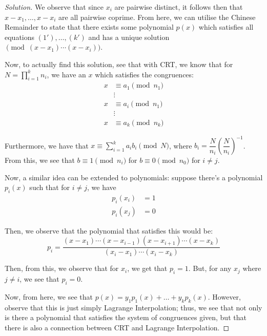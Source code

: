 \documentclass{article}
\newenvironment{solution}{\begin{proof}[Solution]}{\end{proof}}
\let\oldprod\prod
\renewcommand{\prod}[2]{\oldprod\limits_{#1}^{#2}}
\let\oldsum\sum
\renewcommand{\sum}[2]{\oldsum\limits_{#1}^{#2}}
\begin{document}
\begin{solution}
	We observe that since $x_{i}$ are pairwise distinct, it follows then that $x-x_{1}, \ldots, x-x_{i}$ are all pairwise coprime. From here, we can utilise the Chinese Remainder to state that there exists some polynomial $p(x)$ which satisfies all equations $(1'), \ldots, (k')$ and has a unique solution $\pmod{(x-x_{1}) \cdots (x-x_{i})}$.
	
	Now, to actually find this solution, see that with CRT, we know that for $N = \prod{i=1}{k} n_{i}$, we have an $x$ which satisfies the congruences:
	\begin{align*}
		x &\equiv a_{1} \pmod{n_{1}} \\
		&\vdots \\
		x &\equiv a_{i} \pmod{n_{1}} \\
		&\vdots \\
		x &\equiv a_{k} \pmod{n_{k}}
	\end{align*}

	Furthermore, we have that $x \equiv \sum{i=1}{k} a_{i}b_{i} \pmod{N}$, where $b_{i} = \dfrac{N}{n_{i}}\left( \dfrac{N}{n_{i}} \right)^{-1}$. From this, we see that $b \equiv 1 \pmod{n_{i}}$ for $b \equiv 0 \pmod{n_{0}}$ for $i \not= j$.
	
	Now, a similar idea can be extended to polynomials: suppose there's a polynomial $p_{i}(x)$ such that for $i \not= j$, we have
	\begin{align*}
		p_{i}(x_{i}) &= 1 \\
		p_{i}(x_{j}) &= 0
	\end{align*}

	Then, we observe that the polynomial that satisfies this would be:
	\begin{equation*}
		p_{i} = \dfrac{(x-x_{1}) \cdots (x-x_{i-1})(x-x_{i+1}) \cdots (x-x_{k})}{(x_{i}-x_{1}) \cdots (x_{i}-x_{k})}
	\end{equation*}
	
	Then, from this, we observe that for $x_{i}$, we get that $p_{i} = 1$. But, for any $x_{j}$ where $j \not= i$, we see that $p_{i} = 0$.
	
	Now, from here, we see that $p(x) = y_{1}p_{1}(x) + \ldots + y_{k}p_{k}(x)$. However, observe that this is just simply Lagrange Interpolation; thus, we see that not only is there a polynomial that satisfies the system of congruences given, but that there is also a connection between CRT and Lagrange Interpolation.
\end{solution}

\newpage
\end{document}
